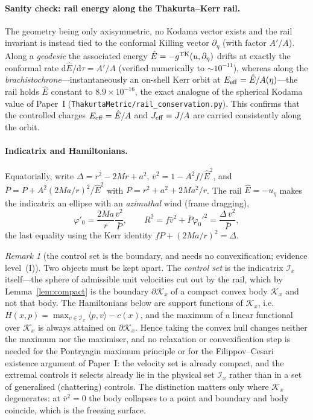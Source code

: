 \documentclass[12pt]{iopart}
\theoremstyle{plain}
\theoremstyle{definition}
\theoremstyle{remark}
\newtheorem{remark}[proposition]{Remark}
\newcommand{\Ehat}{\hat E}
\newcommand{\dd}{\mathrm{d}}
\begin{document}
\paragraph{Sanity check: rail energy along the Thakurta--Kerr rail.} The geometry being
only axisymmetric, no Kodama vector exists and the rail invariant is instead tied to the
conformal Killing vector $\partial_\eta$ (with factor $A'/A$). Along a \emph{geodesic} the
associated energy $\Ehat=-g^{\rm TK}(u,\partial_\eta)$ drifts at exactly the conformal
rate $\dd\Ehat/\dd\tau=A'/A$ (verified numerically to $\sim\!10^{-11}$), whereas along the
\emph{brachistochrone}---instantaneously an on-shell Kerr orbit at
$E_{\rm eff}=\Ehat/A(\eta)$---the rail holds $\Ehat$ constant to $8.9\times10^{-16}$, the
exact analogue of the spherical Kodama value of Paper~I
(\texttt{ThakurtaMetric/rail\_conservation.py}). This confirms that the controlled charges
$E_{\rm eff}=\Ehat/A$ and $J_{\rm eff}=J/A$ are carried consistently along the orbit.

\paragraph{Indicatrix and Hamiltonians.} Equatorially, write
$\Delta=r^2-2Mr+a^2$, $\bar v^2=1-A^2f/\Ehat^2$, and
$\bar P=P+A^2(2Ma/r)^2/\Ehat^2$ with $P=r^2+a^2+2Ma^2/r$. The rail
$\Ehat=-u_\eta$ makes the indicatrix an ellipse with an \emph{azimuthal} wind
(frame dragging),
\begin{equation}
    \varphi'_0=\frac{2Ma}{r}\frac{\bar v^2}{\bar P},\qquad
    R^2=f\bar v^2+\bar P\varphi_0'^2=\frac{\Delta\,\bar v^2}{\bar P},
    \label{eq:tk-ind}
\end{equation}
the last equality using the Kerr identity $fP+(2Ma/r)^2=\Delta$.

\begin{remark}[the control set is the boundary, and needs no convexification;
evidence level~(I)]
\label{rmk:indicatrix}
Two objects must be kept apart. The \emph{control set} is the indicatrix
$\mathcal I_x$ itself---the sphere of admissible unit velocities cut out by the
rail, which by Lemma~\ref{lem:compact} is the boundary $\partial\mathcal K_x$ of
a compact convex body $\mathcal K_x$ and not that body. The Hamiltonians below
are support functions of $\mathcal K_x$, i.e.\ $H(x,p)=\max_{v\in\mathcal
I_x}\langle p,v\rangle-c(x)$, and the maximum of a linear functional over
$\mathcal K_x$ is always attained on $\partial\mathcal K_x$. Hence taking the
convex hull changes neither the maximum nor the maximiser, and no relaxation or
convexification step is needed for the Pontryagin maximum principle or for the
Filippov--Cesari existence argument of Paper~I: the velocity set is already
compact, and the extremal controls it selects already lie in the physical set
$\mathcal I_x$ rather than in a set of generalised (chattering) controls. The
distinction matters only where $\mathcal K_x$ degenerates: at $\bar v^2=0$ the
body collapses to a point and boundary and body coincide, which is the freezing
surface.
\end{remark}
\end{document}
